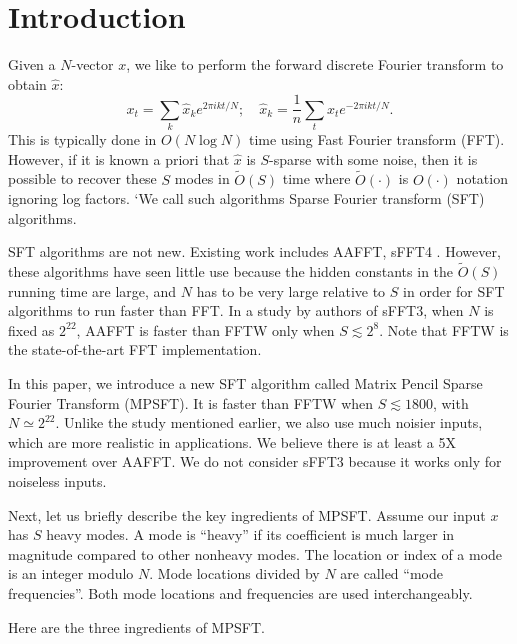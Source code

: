 \documentclass[10pt]{article}
\begin{document}
\pagestyle{plain}
\maketitle

\section{Introduction}
Given a $N$-vector $x$, we like to perform the forward discrete Fourier transform to obtain $\hat{x}$:
$$x_t = \sum_k \hat{x}_k e^{2\pi i kt/N}; \quad \hat{x}_k =\frac{1}{n} \sum_t x_t e^{-2\pi i k t/N}.$$
This is typically done in $O(N \log N)$ time using Fast Fourier transform (FFT). However, if it is known a priori that $\hat{x}$ is $S$-sparse with some noise, then it is possible to recover these $S$ modes in $\tilde{O}(S)$ time where $\tilde{O}(\cdot)$ is $O(\cdot)$ notation ignoring log factors. `We call such algorithms Sparse Fourier transform (SFT) algorithms.

SFT algorithms are not new. Existing work includes AAFFT\cite{iwen2007empirical}, sFFT4 \cite{hassanieh2012simple, hassanieh2012nearly}. However, these algorithms have seen little use because the hidden constants in the $\tilde{O}(S)$ running time are large, and $N$ has to be very large relative to $S$ in order for SFT algorithms to run faster than FFT. In a study by authors of sFFT3, when $N$ is fixed as $2^{22}$, AAFFT is faster than FFTW\cite{FFTW05} only when $S\lesssim 2^8$. Note that FFTW is the state-of-the-art FFT implementation.

In this paper, we introduce a new SFT algorithm called Matrix Pencil Sparse Fourier Transform (MPSFT). It is faster than FFTW when $S \lesssim 1800$, with $N\simeq 2^{22}$. Unlike the study mentioned earlier, we also use much noisier inputs, which are more realistic in applications. We believe there is at least a 5X improvement over AAFFT. We do not consider sFFT3 because it works only for noiseless inputs.

Next, let us briefly describe the key ingredients of MPSFT. Assume our input $x$ has $S$ heavy modes. A mode is ``heavy'' if its coefficient is much larger in magnitude compared to other nonheavy modes. The location or index of a mode is an integer modulo $N$. Mode locations divided by $N$ are called ``mode frequencies''. Both mode locations and frequencies are used interchangeably.

Here are the three ingredients of MPSFT.
\end{document}
